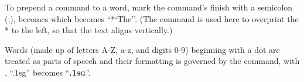 \documentclass{article}
\begin{document}





 To prepend a command to a word, mark the command's finish with a semicolon (;), \gleg {} becomes  which becomes ``*`The''. (The  command is used here to overprint the * to the left, so that the text aligns vertically.)

\begin{exe}
\ex
{}
\end{exe}




 Words (\glie made up of letters A-Z, a-z, and digits 0-9) beginning with a dot are treated as parts of speech and their formatting is governed by the  command, \gleg with , ``.1sg'' becomes ``{\scshape\bfseries\sffamily .1sg}''.

\mfssetposformat{\scshape\bfseries\sffamily}
\begin{exe}
    \ex 
%

\end{exe}
\end{document}
